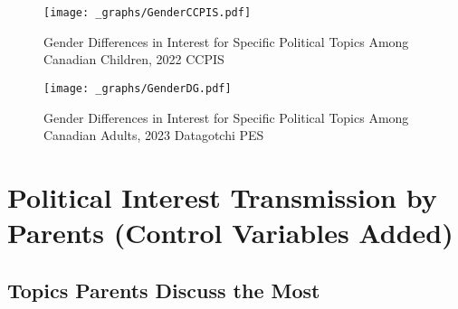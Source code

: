 \documentclass[
  letterpaper,
  DIV=11,
  numbers=noendperiod]{scrreprt}
\begin{document}
\begin{figure}

{\centering \texttt{[image: \_graphs/GenderCCPIS.pdf]}

}

\caption{\label{fig-interestccpis}Gender Differences in Interest for
Specific Political Topics Among Canadian Children, 2022 CCPIS}

\end{figure}

\begin{figure}

{\centering \texttt{[image: \_graphs/GenderDG.pdf]}

}

\caption{\label{fig-interestdg}Gender Differences in Interest for
Specific Political Topics Among Canadian Adults, 2023 Datagotchi PES}

\end{figure}

\hypertarget{sec-appendix5}{%
\chapter{Political Interest Transmission by Parents (Control Variables
Added)}\label{sec-appendix5}}

\hypertarget{topics-parents-discuss-the-most-1}{%
\section{Topics Parents Discuss the
Most}\label{topics-parents-discuss-the-most-1}}
\end{document}
